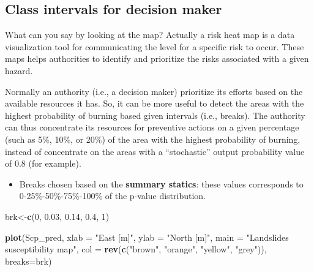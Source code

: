 \documentclass[
]{book}
\newenvironment{Shaded}{\begin{snugshade}}{\end{snugshade}}
\newcommand{\AttributeTok}[1]{\textcolor[rgb]{0.13,0.29,0.53}{#1}}
\newcommand{\DecValTok}[1]{\textcolor[rgb]{0.00,0.00,0.81}{#1}}
\newcommand{\FloatTok}[1]{\textcolor[rgb]{0.00,0.00,0.81}{#1}}
\newcommand{\FunctionTok}[1]{\textcolor[rgb]{0.13,0.29,0.53}{\textbf{#1}}}
\newcommand{\NormalTok}[1]{#1}
\newcommand{\OtherTok}[1]{\textcolor[rgb]{0.56,0.35,0.01}{#1}}
\newcommand{\StringTok}[1]{\textcolor[rgb]{0.31,0.60,0.02}{#1}}
\providecommand{\tightlist}{%
  \setlength{\itemsep}{0pt}\setlength{\parskip}{0pt}}
\begin{document}
\hypertarget{class-intervals-for-decision-maker}{%
\subsection{Class intervals for decision maker}\label{class-intervals-for-decision-maker}}

What can you say by looking at the map?
Actually a risk heat map is a data visualization tool for communicating the level for a specific risk to occur.
These maps helps authorities to identify and prioritize the risks associated with a given hazard.

Normally an authority (i.e., a decision maker) prioritize its efforts based on the available resources it has.
So, it can be more useful to detect the areas with the highest probability of burning based given intervals (i.e., breaks).
The authority can thus concentrate its resources for preventive actions on a given percentage (such as 5\%, 10\%, or 20\%) of the area with the highest probability of burning, instead of concentrate on the areas with a ``stochastic'' output probability value of 0.8 (for example).

\begin{itemize}
\tightlist
\item
  Breaks chosen based on the \textbf{summary statics}: these values corresponds to 0-25\%-50\%-75\%-100\% of the p-value distribution.
\end{itemize}

\begin{Shaded}
\begin{Highlighting}[]
\NormalTok{brk}\OtherTok{\textless{}{-}}\FunctionTok{c}\NormalTok{(}\DecValTok{0}\NormalTok{, }\FloatTok{0.03}\NormalTok{, }\FloatTok{0.14}\NormalTok{, }\FloatTok{0.4}\NormalTok{, }\DecValTok{1}\NormalTok{) }

\FunctionTok{plot}\NormalTok{(Scp\_pred, }\AttributeTok{xlab =} \StringTok{"East [m]"}\NormalTok{, }\AttributeTok{ylab =} \StringTok{"North [m]"}\NormalTok{, }
     \AttributeTok{main =} \StringTok{"Landslides susceptibility map"}\NormalTok{, }
     \AttributeTok{col =} \FunctionTok{rev}\NormalTok{(}\FunctionTok{c}\NormalTok{(}\StringTok{"brown"}\NormalTok{, }\StringTok{"orange"}\NormalTok{, }\StringTok{"yellow"}\NormalTok{, }\StringTok{"grey"}\NormalTok{)), }\AttributeTok{breaks=}\NormalTok{brk)}
\end{Highlighting}
\end{Shaded}
\end{document}
